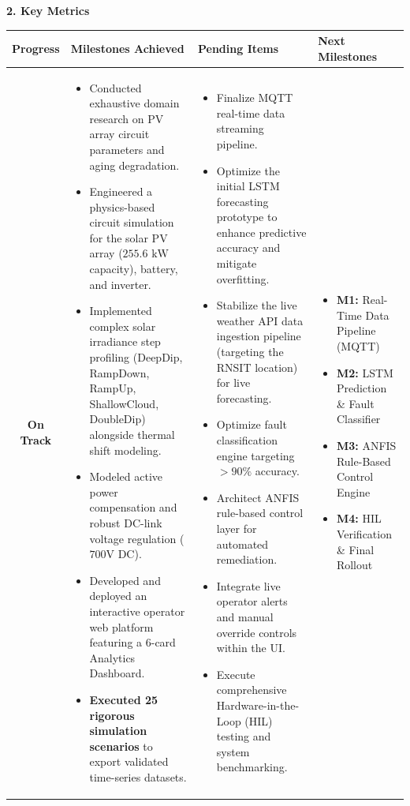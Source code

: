 \documentclass[11pt,a4paper]{article}
\newcommand{\sectionheader}[1]{\vspace{10pt}\noindent\Large\textbf{#1}\vspace{4pt}\normalsize}
\newcommand{\tablehead}[1]{\textbf{#1}}
\begin{document}
\newpage
\sectionheader{2. Key Metrics}
\begin{table}[H]
    \renewcommand{\arraystretch}{1.4}
    \centering
    \begin{tabularx}{\textwidth}{|c|X|X|X|}
    \hline
    \tablehead{Progress} & \tablehead{Milestones Achieved} & \tablehead{Pending Items} & \tablehead{Next Milestones} \\
    \hline
    \textbf{On Track} & 
    \begin{itemize}
        \item Conducted exhaustive domain research on PV array circuit parameters and aging degradation.
        \item Engineered a physics-based circuit simulation for the solar PV array ($255.6\text{ kW}$ capacity), battery, and inverter.
        \item Implemented complex solar irradiance step profiling (DeepDip, RampDown, RampUp, ShallowCloud, DoubleDip) alongside thermal shift modeling.
        \item Modeled active power compensation and robust DC-link voltage regulation ($700\text{V DC}$).
        \item Developed and deployed an interactive operator web platform featuring a 6-card Analytics Dashboard.
        \item \textbf{Executed 25 rigorous simulation scenarios} to export validated time-series datasets.
    \end{itemize}
    & 
    \begin{itemize}
        \item Finalize MQTT real-time data streaming pipeline.
        \item Optimize the initial LSTM forecasting prototype to enhance predictive accuracy and mitigate overfitting.
        \item Stabilize the live weather API data ingestion pipeline (targeting the RNSIT location) for live forecasting.
        \item Optimize fault classification engine targeting $>90\%$ accuracy.
        \item Architect ANFIS rule-based control layer for automated remediation.
        \item Integrate live operator alerts and manual override controls within the UI.
        \item Execute comprehensive Hardware-in-the-Loop (HIL) testing and system benchmarking.
    \end{itemize}
    & 
    \begin{itemize}
        \item \textbf{M1:} Real-Time Data Pipeline (MQTT)
        \item \textbf{M2:} LSTM Prediction \& Fault Classifier
        \item \textbf{M3:} ANFIS Rule-Based Control Engine
        \item \textbf{M4:} HIL Verification \& Final Rollout
    \end{itemize}
    \\
    \hline
    \end{tabularx}
\end{table}
\end{document}
